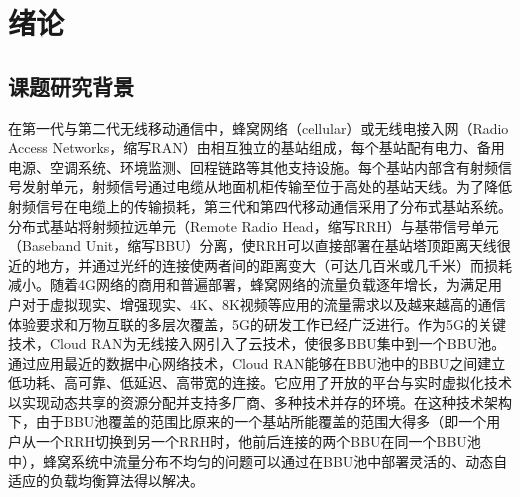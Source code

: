 
\chapter{绪论}
\label{chap:Intro}
\section{课题研究背景}
在第一代与第二代无线移动通信中，蜂窝网络（cellular）或无线电接入网（Radio Access Networks，缩写RAN）由相互独立的基站组成，每个基站配有电力、备用电源、空调系统、环境监测、回程链路等其他支持设施。每个基站内部含有射频信号发射单元，射频信号通过电缆从地面机柜传输至位于高处的基站天线。为了降低射频信号在电缆上的传输损耗，第三代和第四代移动通信采用了分布式基站系统。分布式基站将射频拉远单元（Remote Radio Head，缩写RRH）与基带信号单元（Baseband Unit，缩写BBU）分离，使RRH可以直接部署在基站塔顶距离天线很近的地方，并通过光纤的连接使两者间的距离变大（可达几百米或几千米）而损耗减小。随着4G网络的商用和普遍部署，蜂窝网络的流量负载逐年增长，为满足用户对于虚拟现实、增强现实、4K、8K视频等应用的流量需求以及越来越高的通信体验要求和万物互联的多层次覆盖，5G的研发工作已经广泛进行。作为5G的关键技术，Cloud RAN为无线接入网引入了云技术，使很多BBU集中到一个BBU池。通过应用最近的数据中心网络技术，Cloud RAN能够在BBU池中的BBU之间建立低功耗、高可靠、低延迟、高带宽的连接。它应用了开放的平台与实时虚拟化技术以实现动态共享的资源分配并支持多厂商、多种技术并存的环境。在这种技术架构下，由于BBU池覆盖的范围比原来的一个基站所能覆盖的范围大得多（即一个用户从一个RRH切换到另一个RRH时，他前后连接的两个BBU在同一个BBU池中）\cite{ran2015optimal}，蜂窝系统中流量分布不均匀的问题可以通过在BBU池中部署灵活的、动态自适应的负载均衡算法得以解决。

